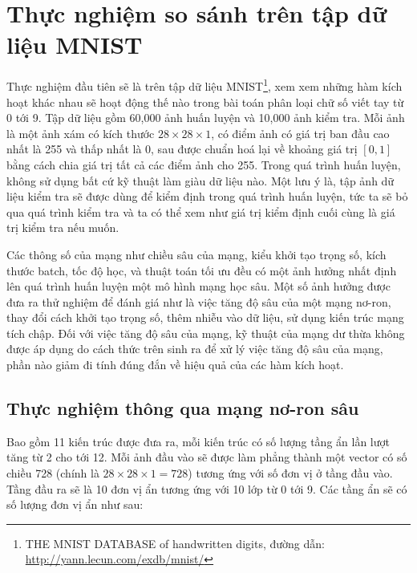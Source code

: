 \chapter{Thực nghiệm so sánh trên tập dữ liệu MNIST}\label{chap:thucnghiemmnist}

Thực nghiệm đầu tiên sẽ là trên tập dữ liệu MNIST\footnote{THE MNIST DATABASE of handwritten digits, đường dẫn: \href{http://yann.lecun.com/exdb/mnist/}{http://yann.lecun.com/exdb/mnist/}}, xem xem những hàm kích hoạt khác nhau sẽ hoạt động thế nào  trong bài toán phân loại chữ số viết tay từ 0 tới 9.
Tập dữ liệu gồm 60,000 ảnh huấn luyện và 10,000 ảnh kiểm tra.
Mỗi ảnh là một ảnh xám có kích thước $28 \times 28 \times 1$, có điểm ảnh có giá trị ban đầu cao nhất là 255 và thấp nhất là 0, sau được chuẩn hoá lại về khoảng giá trị $[0, 1]$ bằng cách chia giá trị tất cả các điểm ảnh cho 255.
Trong quá trình huấn luyện, không sử dụng bất cứ kỹ thuật làm giàu dữ liệu nào.
Một lưu ý là, tập ảnh dữ liệu kiểm tra sẽ được dùng để kiểm định trong quá trình huấn luyện, tức ta sẽ bỏ qua quá trình kiểm tra và ta có thể xem như giá trị kiểm định cuối cùng là giá trị kiểm tra nếu muốn.
\vspace{5pt}

Các thông số của mạng như chiều sâu của mạng, kiểu khởi tạo trọng số, kích thước batch, tốc độ học, và thuật toán tối ưu đều có một ảnh hưởng nhất định lên quá trình huấn luyện một mô hình mạng học sâu.
Một số ảnh hưởng được đưa ra thử nghiệm để đánh giá như là việc tăng độ sâu của một mạng nơ-ron, thay đổi cách khởi tạo trọng số, thêm nhiễu vào dữ liệu, sử dụng kiến trúc mạng tích chập.
Đối với việc tăng độ sâu của mạng, kỹ thuật của mạng dư thừa không được áp dụng do cách thức trên sinh ra để xử lý việc tăng độ sâu của mạng, phần nào giảm đi tính đúng đắn về hiệu quả của các hàm kích hoạt.

\section{Thực nghiệm thông qua mạng nơ-ron sâu}\label{sec:mnistdl}

Bao gồm 11 kiến trúc được đưa ra, mỗi kiến trúc có số lượng tầng ẩn lần lượt tăng từ 2 cho tới 12.
Mỗi ảnh đầu vào sẽ được làm phẳng thành một vector có số chiều 728 (chính là $28 \times 28 \times 1 = 728$) tương ứng với số đơn vị ở tầng đầu vào.
Tầng đầu ra sẽ là 10 đơn vị ẩn tương ứng với 10 lớp từ 0 tới 9.
Các tầng ẩn sẽ có số lượng đơn vị ẩn như sau:

